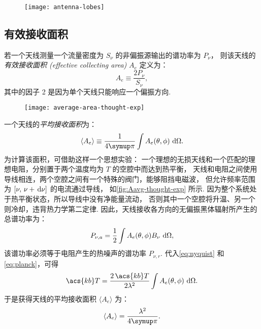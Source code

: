 \begin{figure}
  \centering
  \texttt{[image: antenna-lobes]}
  \label{fig:lobes}
\end{figure}

\subsection{有效接收面积}

若一个天线测量一个流量密度为 $S_{\nu}$ 的非偏振源输出的谱功率为 $P_{\nu}$，
则该天线的\emph{有效接收面积 (effective collecting area)} $A_e$ 定义为：
\begin{equation}
  \label{eq:area-eff}
  A_e \equiv \frac{2 P_{\nu}}{S_{\nu}} ,
\end{equation}
其中的因子 2 是因为单个天线只能响应一个偏振方向.

\begin{figure}
  \centering
  \texttt{[image: average-area-thought-exp]}
  \label{fig:Aavg-thought-exp}
\end{figure}

一个天线的\emph{平均接收面积}为：
\begin{equation}
  \label{eq:area-avg1}
  \langle A_e \rangle
    \equiv \frac{1}{4\Cpi} \int A_e(\theta,\phi) \,\D{\Omega} .
\end{equation}
为计算该面积，可借助这样一个思想实验：
一个理想的无损天线和一个匹配的理想电阻，分别置于两个温度均为 $T$ 的空腔中而达到热平衡，
天线和电阻之间使用导线相连，两个空腔之间有一个特殊的阀门，能够阻挡电磁波，
但允许频率范围为 $[\nu, \,\nu+\,\mathrm{d}\nu]$ 的电流通过导线，
如\autoref{fig:Aavg-thought-exp} 所示.
因为整个系统处于热平衡状态，所以导线中没有净能量流动，
否则其中一个空腔将升温、另一个则冷却，违背热力学第二定律.
因此，天线接收各方向的无偏振黑体辐射所产生的总谱功率为：
\begin{equation}
  P_{\nu,a} = \frac{1}{2} \int A_e(\theta,\phi) B_{\nu} \,\,\mathrm{d}\Omega ,
\end{equation}
该谱功率必须等于电阻产生的热噪声的谱功率 $P_{\nu,r}$.
代入\autoref{eq:nyquist} 和\autoref{eq:planck}，可得
\begin{equation}
  \acs{kb}T = \frac{2\,\acs{kb}T}{2\lambda^2}
    \int A_e(\theta,\phi) \,\D{\Omega} .
\end{equation}
于是获得天线的平均接收面积 $\langle A_e \rangle$ 为：
\begin{equation}
  \label{eq:area-avg}
  \langle A_e \rangle = \frac{\lambda^2}{4\Cpi}.
\end{equation}


